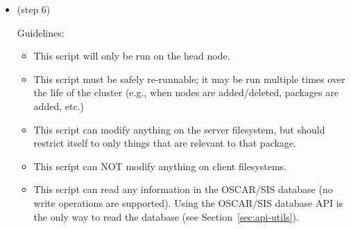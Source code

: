 \begin{itemize}
  Guidelines:

  \begin{itemize}
  \item This script will be run on the client filesystem.  That is, it
    will either be chrooted to the image or run on all of the actual
    nodes themselves.
  \item This use of this API script is strongly discouraged.  The
    contents of this script should normally be contained in the \%post
    scripts in the RPMs themselves.  This API script is only here to
    help taking third party non-OSCAR-ized RPMs and graft them into
    the OSCAR framework without needing to re-make the RPM.
  \item This script must be safely re-runnable; it may be run multiple
    times over the life of the cluster.
  \item This script can modify anything on the client filesystem, but
    should restrict itself to only things that are relevant to that
    package.
  \item This script cannot use anything from the OSCAR/SIS database.
    \footnote{This may change in future versions of the API, but for
      now, nothing in the OSCAR/SIS DB is available during this step.}
    The only piece of global information that is available is the
    hostname oscar\_server, which will be set correctly in the
    /etc/hosts on every node/image.

    \begin{discuss}
      This point will become moot soon.
    \end{discuss}
  \end{itemize}

  Parameters:

  \begin{itemize}
  \item None.
  \end{itemize}

\item {} (step 6)

  Guidelines:

  \begin{itemize}
  \item This script will only be run on the head node.
  \item This script must be safely re-runnable; it may be run multiple
    times over the life of the cluster (e.g., when nodes are
    added/deleted, packages are added, etc.)
  \item This script can modify anything on the server filesystem, but
    should restrict itself to only things that are relevant to that
    package.
  \item This script can NOT modify anything on client filesystems.
  \item This script can read any information in the OSCAR/SIS database
    (no write operations are supported).  Using the OSCAR/SIS database
    API is the only way to read the database (see
    Section~\ref{sec:api-utils}).


\end{itemize}
\end{itemize}
